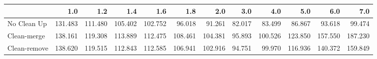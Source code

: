 \begin{tabular}{lrrrrrrrrrrr}
\toprule
{} &     1.0 &     1.2 &     1.4 &     1.6 &     1.8 &     2.0 &    3.0 &     4.0 &     5.0 &     6.0 &     7.0 \\
\midrule
No Clean Up  & 131.483 & 111.480 & 105.402 & 102.752 &  96.018 &  91.261 & 82.017 &  83.499 &  86.867 &  93.618 &  99.474 \\
Clean-merge  & 138.161 & 119.308 & 113.889 & 112.475 & 108.461 & 104.381 & 95.893 & 100.526 & 123.850 & 157.550 & 187.230 \\
Clean-remove & 138.620 & 119.515 & 112.843 & 112.585 & 106.941 & 102.916 & 94.751 &  99.970 & 116.936 & 140.372 & 159.849 \\
\bottomrule
\end{tabular}
